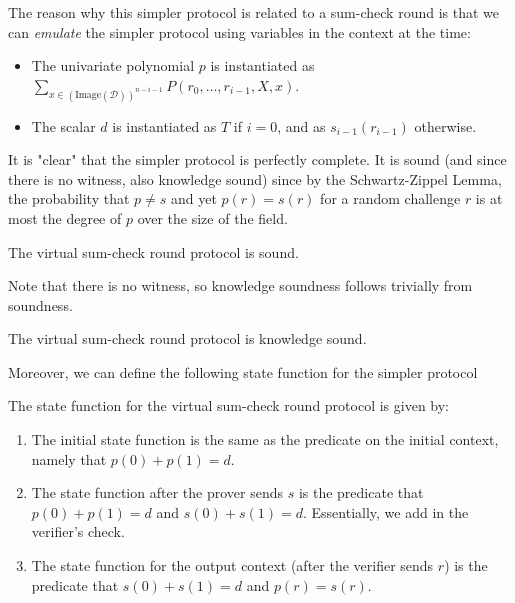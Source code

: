 The reason why this simpler protocol is related to a sum-check round is that we can \emph{emulate} the simpler protocol using variables in the context at the time:
\begin{itemize}
    \item The univariate polynomial $p$ is instantiated as $\sum_{x \in (\text{Image}(\mathcal{D}))^{n - i - 1}} P(r_0, \ldots, r_{i - 1}, X, x)$.
    \item The scalar $d$ is instantiated as $T$ if $i = 0$, and as $s_{i - 1}(r_{i - 1})$ otherwise.
\end{itemize}

It is "clear" that the simpler protocol is perfectly complete. It is sound (and since there is no
witness, also knowledge sound) since by the Schwartz-Zippel Lemma, the probability that $p \ne s$
and yet $p(r) = s(r)$ for a random challenge $r$ is at most the degree of $p$ over the size of the
field.

\begin{theorem}
    The virtual sum-check round protocol is sound.
    \label{thm:virtual_sumcheck_round_protocol_sound}
\end{theorem}

Note that there is no witness, so knowledge soundness follows trivially from soundness.

\begin{theorem}
    The virtual sum-check round protocol is knowledge sound.
    \label{thm:virtual_sumcheck_round_protocol_knowledge_sound}
\end{theorem}

Moreover, we can define the following state function for the simpler protocol

\begin{definition}
    \label{def:virtual_sumcheck_round_protocol_state_function}
    The state function for the virtual sum-check round protocol is given by:
\begin{enumerate}
    \item The initial state function is the same as the predicate on the initial context, namely that
    $p(0) + p(1) = d$.
    \item The state function after the prover sends $s$ is the predicate that $p(0) + p(1) = d$ and
    $s(0) + s(1) = d$. Essentially, we add in the verifier's check.
    \item The state function for the output context (after the verifier sends $r$) is the predicate that $s(0) + s(1) = d$ and $p(r) = s(r)$.
\end{enumerate}
\end{definition}

